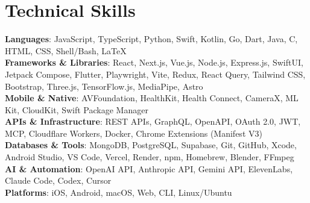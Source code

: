 \documentclass[letterpaper,11pt]{article}
\begin{document}
\section{Technical Skills}
 \begin{itemize}[leftmargin=0.15in, label={}]
    \small{\item{
     \textbf{Languages}{: JavaScript, TypeScript, Python, Swift, Kotlin, Go, Dart, Java, C, HTML, CSS, Shell/Bash, LaTeX} \\
     \textbf{Frameworks \& Libraries}{: React, Next.js, Vue.js, Node.js, Express.js, SwiftUI, Jetpack Compose, Flutter, Playwright, Vite, Redux, React Query, Tailwind CSS, Bootstrap, Three.js, TensorFlow.js, MediaPipe, Astro} \\
     \textbf{Mobile \& Native}{: AVFoundation, HealthKit, Health Connect, CameraX, ML Kit, CloudKit, Swift Package Manager} \\
     \textbf{APIs \& Infrastructure}{: REST APIs, GraphQL, OpenAPI, OAuth 2.0, JWT, MCP, Cloudflare Workers, Docker, Chrome Extensions (Manifest V3)} \\
     \textbf{Databases \& Tools}{: MongoDB, PostgreSQL, Supabase, Git, GitHub, Xcode, Android Studio, VS Code, Vercel, Render, npm, Homebrew, Blender, FFmpeg} \\
     \textbf{AI \& Automation}{: OpenAI API, Anthropic API, Gemini API, ElevenLabs, Claude Code, Codex, Cursor} \\
     \textbf{Platforms}{: iOS, Android, macOS, Web, CLI, Linux/Ubuntu}
    }}
 \end{itemize}

\end{document}
